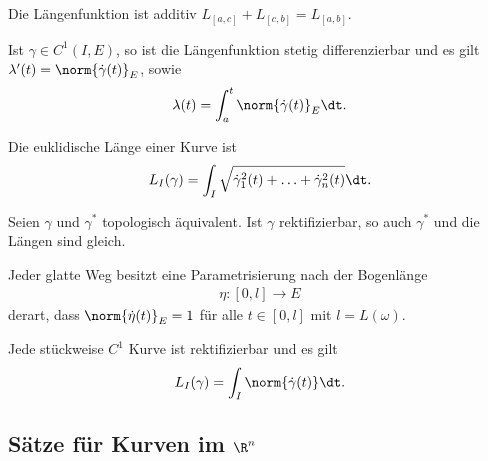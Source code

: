 \begin{prop}
Die Längenfunktion ist additiv $L_{[a,c]}+L_{[c,b]} = L_{[a,b]}$.
\end{prop}
\begin{prop}
Ist $\gamma\in C^1(I,E)$, so ist die Längenfunktion stetig differenzierbar und
es gilt $\lambda'(t) = \norm{\dot{\gamma}(t)}_E$, sowie
\begin{align*}
\lambda(t) = \int_a^t \norm{\dot{\gamma}(t)}_E\dt.
\end{align*}
\end{prop}
\begin{prop}
Die euklidische Länge einer Kurve ist
\begin{align*}
L_I(\gamma) = \int_I
\sqrt{\dot{\gamma}_1^2(t)+\ldots+\dot{\gamma}_n^2(t)}\dt.
\end{align*}
\end{prop}
\begin{prop}
Seien $\gamma$ und $\gamma^*$ topologisch äquivalent. Ist $\gamma$
rektifizierbar, so auch $\gamma^*$ und die Längen sind gleich.
\end{prop}
\begin{prop}
Jeder glatte Weg besitzt eine Parametrisierung nach der Bogenlänge 
\begin{align*}
\eta: [0,l]\to E
\end{align*}
derart, dass $\norm{\dot{\eta}(t)}_E = 1$ für alle $t\in[0,l]$ mit $l =
L(\omega)$.
\end{prop}
\begin{prop}
Jede stückweise $C^1$ Kurve ist rektifizierbar und es gilt
\begin{align*}
L_I(\gamma) = \int_I \norm{\dot{\gamma}(t)}\dt.
\end{align*}
\end{prop}

\subsection{Sätze für Kurven im $\R^n$}

